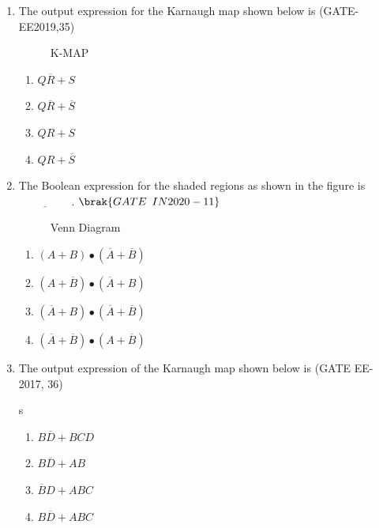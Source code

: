 \begin{enumerate}
\item The output expression for the Karnaugh map shown below is
                                \hfill(GATE-EE2019,35)
		\begin{figure}[h]
            \centering		
   		
      	\caption{K-MAP}
		\end{figure}
\begin{enumerate}
    \item $Q\overline{R} + S$
    \item $Q\overline{R} + \overline{S}$
    \item $QR + S$
    \item $QR + \overline{S}$
\end{enumerate}



\item The Boolean expression for the shaded 
regions as shown in the figure is $\underline{\hspace{2cm}}$.
$\hfill\brak{GATE \enspace IN2020-11}$

\begin{figure}[H]

\caption{Venn Diagram}
\label{fig:figure12}
\end{figure}


\begin{enumerate}
\item $(A + B)\bullet(\overline{A} + \overline{B})$
\item $(A + \overline{B})\bullet(\overline{A} + B)$
\item $(\overline{A} +  B)\bullet
(\overline{A} + \overline{B})$
\item $(\overline{A} + \overline{B})\bullet
(A + \overline{B})$
\end{enumerate}

\item The output expression of the Karnaugh map shown below is
				\hfill(GATE EE-2017, 36)

\begin{figure}[!ht]
\centering

\label{fig:k-map-E}
\end{figure}s

\begin{enumerate}[label=\Alph*.]
\item $B\overline{D} + BCD$
\item $B\overline{D} + AB$
\item $\overline{B}D + ABC$
\item $B\overline{D} + ABC$
\end{enumerate}


\end{enumerate}
